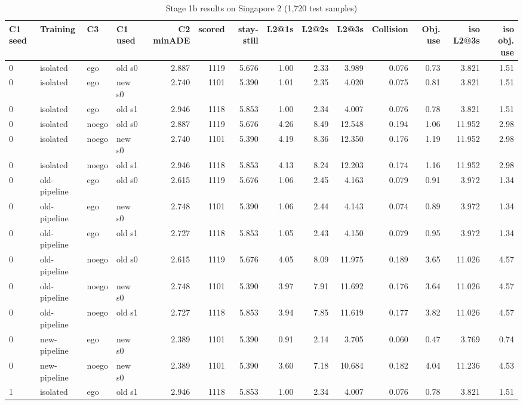 \documentclass[10pt,a4paper]{article}
\begin{document}
\begin{landscape}
\begin{table}[h!]\centering\scriptsize\caption{Stage 1b results on Singapore 2 (1{,}720 test samples)}
\begin{tabular}{llllrrrrrrrrrr}\toprule
C1 seed & Training & C3 & C1 used & C2 minADE & scored & stay-still & L2@1s & L2@2s & L2@3s & Collision & Obj. use & iso L2@3s & iso obj. use\\\midrule
0 & isolated & ego & old s0 & 2.887 & 1119 & 5.676 & 1.00 & 2.33 & 3.989 & 0.076 & 0.73 & 3.821 & 1.51\\
0 & isolated & ego & new s0 & 2.740 & 1101 & 5.390 & 1.01 & 2.35 & 4.020 & 0.075 & 0.81 & 3.821 & 1.51\\
0 & isolated & ego & old s1 & 2.946 & 1118 & 5.853 & 1.00 & 2.34 & 4.007 & 0.076 & 0.78 & 3.821 & 1.51\\
0 & isolated & noego & old s0 & 2.887 & 1119 & 5.676 & 4.26 & 8.49 & 12.548 & 0.194 & 1.06 & 11.952 & 2.98\\
0 & isolated & noego & new s0 & 2.740 & 1101 & 5.390 & 4.19 & 8.36 & 12.350 & 0.176 & 1.19 & 11.952 & 2.98\\
0 & isolated & noego & old s1 & 2.946 & 1118 & 5.853 & 4.13 & 8.24 & 12.203 & 0.174 & 1.16 & 11.952 & 2.98\\
\midrule
0 & old-pipeline & ego & old s0 & 2.615 & 1119 & 5.676 & 1.06 & 2.45 & 4.163 & 0.079 & 0.91 & 3.972 & 1.34\\
0 & old-pipeline & ego & new s0 & 2.748 & 1101 & 5.390 & 1.06 & 2.44 & 4.143 & 0.074 & 0.89 & 3.972 & 1.34\\
0 & old-pipeline & ego & old s1 & 2.727 & 1118 & 5.853 & 1.05 & 2.43 & 4.150 & 0.079 & 0.95 & 3.972 & 1.34\\
0 & old-pipeline & noego & old s0 & 2.615 & 1119 & 5.676 & 4.05 & 8.09 & 11.975 & 0.189 & 3.65 & 11.026 & 4.57\\
0 & old-pipeline & noego & new s0 & 2.748 & 1101 & 5.390 & 3.97 & 7.91 & 11.692 & 0.176 & 3.64 & 11.026 & 4.57\\
0 & old-pipeline & noego & old s1 & 2.727 & 1118 & 5.853 & 3.94 & 7.85 & 11.619 & 0.177 & 3.82 & 11.026 & 4.57\\
\midrule
0 & new-pipeline & ego & new s0 & 2.389 & 1101 & 5.390 & 0.91 & 2.14 & 3.705 & 0.060 & 0.47 & 3.769 & 0.74\\
0 & new-pipeline & noego & new s0 & 2.389 & 1101 & 5.390 & 3.60 & 7.18 & 10.684 & 0.182 & 4.04 & 11.236 & 4.53\\
\midrule
1 & isolated & ego & old s1 & 2.946 & 1118 & 5.853 & 1.00 & 2.34 & 4.007 & 0.076 & 0.78 & 3.821 & 1.51\\

\end{tabular}
\end{table}
\end{landscape}
\end{document}
